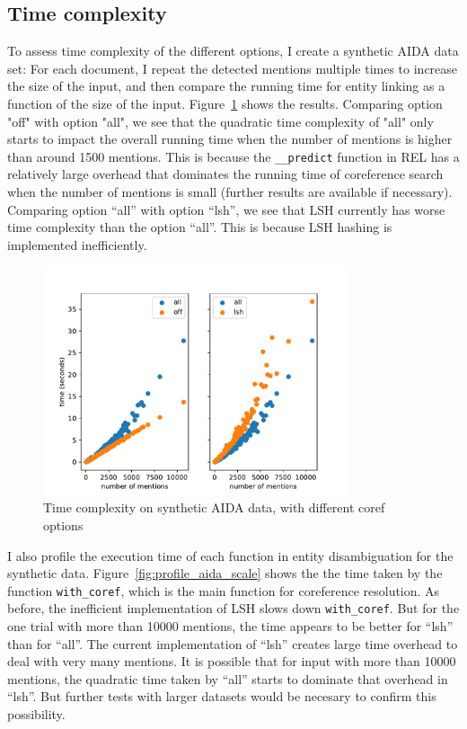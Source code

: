 \documentclass[a4paper,11pt]{article}
\numberwithin{equation}{section} %
\begin{document}
\subsection{Time complexity}
To assess time complexity of the different options, I create a synthetic AIDA data set: For each document, I repeat the detected mentions multiple times to increase the size of the input, and then compare the running time for entity linking as a function of the size of the input. Figure~\ref{fig:timing_aida_scale} shows the results.
Comparing option "off" with option "all", we see that the quadratic time complexity of "all" only starts to impact the overall running time when the number of mentions is higher than around 1500 mentions. This is because the \verb|__predict| function in REL has a relatively large overhead that dominates the running time of coreference search when the number of mentions is small (further results are available if necessary).
Comparing option ``all'' with option ``lsh'', we see that LSH currently has worse time complexity than the option ``all''. This is because LSH hashing is implemented inefficiently.

\begin{figure}[H]
  \centering
  \includegraphics[width = 0.8\textwidth]{../figs/timing_aida_scale.pdf}
  \caption{Time complexity on synthetic AIDA data, with different coref options}
  \label{fig:timing_aida_scale}
\end{figure}

I also profile the execution time of each function in entity disambiguation for the synthetic data. Figure~\ref{fig:profile_aida_scale} shows the the time taken by the function \verb|with_coref|, which is the main function for coreference resolution. As before, the inefficient implementation of LSH slows down 
\verb|with_coref|. But for the one trial with more than 10000 mentions, the time appears to be better for ``lsh'' than for ``all''.
The current implementation of ``lsh'' creates large time overhead to deal with very many mentions. It is possible that for input with more than 10000 mentions, the quadratic time taken by ``all'' starts to dominate that overhead in ``lsh''. But further tests with larger datasets would be necesary to confirm this possibility.
\end{document}
